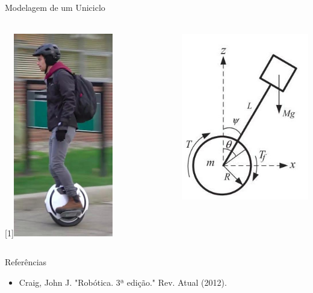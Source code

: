 \documentclass{beamer}
\begin{document}
\begin{frame}[c]{{Modelagem de um Uniciclo}}
    \framesubtitle{}
    \begin{columns}
        \begin{column}[c]{0.4\textwidth}
            \centering
            \scalebox{-1}[1]{\includegraphics[width=0.6\textwidth]{images/unicycle_2.jpg}}
        \end{column}
        \begin{column}[c]{0.6\textwidth}
            \centering
            \includegraphics[width=.6\textwidth]{images/unicycle_model.jpg}
        \end{column}
    \end{columns}   
\end{frame}



\begin{frame}[t]{Referências}
    \begin{itemize}
        \item Craig, John J. "Robótica. 3ª edição." Rev. Atual (2012).      
    \end{itemize}
\end{frame}
\end{document}
